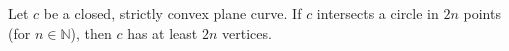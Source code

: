 Let $c$ be a closed, strictly convex plane curve. If $c$ intersects a circle in $2n$ points (for $n \in \mathbb{N}$), then $c$ has at least $2n$ vertices.
